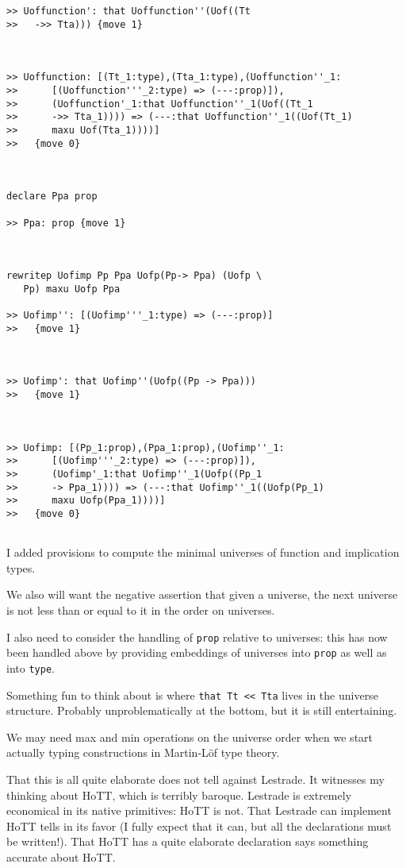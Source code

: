 \documentclass{article}
\begin{document}
\begin{verbatim}
>> Uoffunction': that Uoffunction''(Uof((Tt
>>   ->> Tta))) {move 1}



>> Uoffunction: [(Tt_1:type),(Tta_1:type),(Uoffunction''_1:
>>      [(Uoffunction'''_2:type) => (---:prop)]),
>>      (Uoffunction'_1:that Uoffunction''_1(Uof((Tt_1
>>      ->> Tta_1)))) => (---:that Uoffunction''_1((Uof(Tt_1)
>>      maxu Uof(Tta_1))))]
>>   {move 0}



declare Ppa prop

>> Ppa: prop {move 1}



rewritep Uofimp Pp Ppa Uofp(Pp-> Ppa) (Uofp \
   Pp) maxu Uofp Ppa

>> Uofimp'': [(Uofimp'''_1:type) => (---:prop)]
>>   {move 1}



>> Uofimp': that Uofimp''(Uofp((Pp -> Ppa)))
>>   {move 1}



>> Uofimp: [(Pp_1:prop),(Ppa_1:prop),(Uofimp''_1:
>>      [(Uofimp'''_2:type) => (---:prop)]),
>>      (Uofimp'_1:that Uofimp''_1(Uofp((Pp_1
>>      -> Ppa_1)))) => (---:that Uofimp''_1((Uofp(Pp_1)
>>      maxu Uofp(Ppa_1))))]
>>   {move 0}


\end{verbatim}

I added provisions to compute the minimal universes of function and implication types.

We also will want the negative assertion that given a universe, the next universe is not less than or equal to it in the order on universes.

I also need to consider the handling of {\tt prop} relative to universes:  this has  now been handled above by providing embeddings of universes into {\tt prop} as well as into {\tt type}.

Something fun to think about is where {\tt that Tt << Tta} lives in the universe structure.  Probably unproblematically at the bottom, but it is still entertaining.

We may need max and min operations on the universe order when we start actually typing constructions in Martin-L\"of type theory.

That this is all quite elaborate does not tell against Lestrade.  It witnesses my thinking about HoTT, which is terribly baroque.  Lestrade is extremely economical in its native primitives:
HoTT is not.  That Lestrade can implement HoTT tells in its favor (I fully expect that it can, but all the declarations must be written!).  That HoTT has a quite elaborate declaration says something accurate about HoTT.
\end{document}
